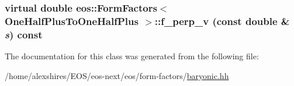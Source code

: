 \label{classeos_1_1FormFactors_3_01OneHalfPlusToOneHalfPlus_01_4_adf134b63172b8dc387be13e7cf576e4c}
\hypertarget{classeos_1_1FormFactors_3_01OneHalfPlusToOneHalfPlus_01_4_a7529b97bf3272ecfaf71f68681f14f89}{
\subsubsection[{f\_\-perp\_\-v}]{\setlength{\rightskip}{0pt plus 5cm}virtual double eos::FormFactors$<$ {\bf OneHalfPlusToOneHalfPlus} $>$::f\_\-perp\_\-v (const double \& {\em s}) const}}
\label{classeos_1_1FormFactors_3_01OneHalfPlusToOneHalfPlus_01_4_a7529b97bf3272ecfaf71f68681f14f89}


The documentation for this class was generated from the following file:\begin{DoxyCompactItemize}
\item 
/home/alexshires/EOS/eos-\/next/eos/form-\/factors/\hyperlink{baryonic_8hh}{baryonic.hh}\end{DoxyCompactItemize}
